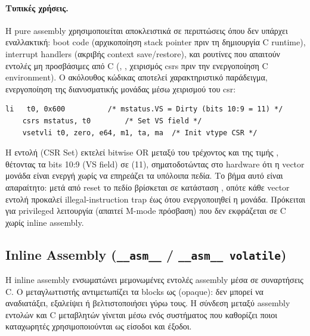 \paragraph{Τυπικές χρήσεις.}
Η pure assembly χρησιμοποιείται αποκλειστικά σε περιπτώσεις όπου δεν
υπάρχει εναλλακτική: boot code (αρχικοποίηση stack pointer πριν τη δημιουργία
C runtime), interrupt handlers (ακριβής context save/restore), και ρουτίνες
που απαιτούν εντολές μη προσβάσιμες από C (, ,
χειρισμός \glspl{csr} πριν την ενεργοποίηση C environment). Ο ακόλουθος
κώδικας αποτελεί χαρακτηριστικό παράδειγμα, ενεργοποίηση της διανυσματικής
μονάδας μέσω χειρισμού του  \gls{csr}:

\begin{lstlisting}[language={[RISC-V]Assembler},
  caption={Ενεργοποίηση Vector Unit μέσω \code{mstatus.VS} σε bare-metal
    boot sequence.},
  label={lst:vector-enable}]
    li   t0, 0x600          /* mstatus.VS = Dirty (bits 10:9 = 11) */
    csrs mstatus, t0        /* Set VS field */
    vsetvli t0, zero, e64, m1, ta, ma  /* Init vtype CSR */
\end{lstlisting}

Η εντολή  (CSR Set) εκτελεί bitwise OR μεταξύ του τρέχοντος
 και της τιμής , θέτοντας τα bits 10:9 (VS field) 
σε  (11), σηματοδοτώντας στο hardware ότι η vector μονάδα είναι ενεργή 
χωρίς να επηρεάζει τα υπόλοιπα πεδία. Το βήμα αυτό είναι απαραίτητο: μετά από reset το πεδίο  βρίσκεται
σε κατάσταση , οπότε κάθε vector εντολή προκαλεί illegal-instruction
trap έως ότου ενεργοποιηθεί η μονάδα. Πρόκειται για privileged λειτουργία
(απαιτεί M-mode πρόσβαση) που δεν εκφράζεται σε C χωρίς inline assembly.

\subsection{Inline Assembly (\texttt{\_\_asm\_\_} / \texttt{\_\_asm\_\_ volatile})}
\label{ssec:inline-assembly}

Η inline assembly ενσωματώνει μεμονωμένες εντολές assembly μέσα σε
συναρτήσεις C. Ο μεταγλωττιστής αντιμετωπίζει τα  blocks
ως  (opaque): δεν μπορεί να αναδιατάξει, εξαλείψει ή
βελτιστοποιήσει γύρω τους. Η σύνδεση μεταξύ assembly εντολών και C
μεταβλητών γίνεται μέσω ενός συστήματος  που
καθορίζει ποιοι καταχωρητές χρησιμοποιούνται ως είσοδοι και έξοδοι.

